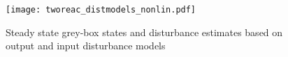 \documentclass{article}
\begin{document}
\begin{figure}[!h]
  \centering
  \texttt{[image: tworeac\_distmodels\_nonlin.pdf]}
  \caption{Steady state grey-box states and disturbance estimates based on 
  output and input disturbance models}
  \label{fig:cost_nonlinear_10hours}
\end{figure}



\end{document}
